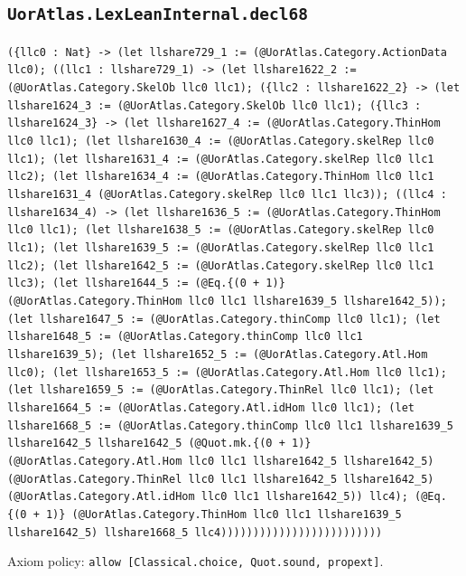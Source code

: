 \documentclass[11pt]{article}
\begin{document}
\subsection*{\texttt{UorAtlas.LexLeanInternal.decl68}}
\noindent\texttt{(\{llc0 : Nat\} -> (let llshare729\_1 := (@UorAtlas.Category.ActionData llc0); ((llc1 : llshare729\_1) -> (let llshare1622\_2 := (@UorAtlas.Category.SkelOb llc0 llc1); (\{llc2 : llshare1622\_2\} -> (let llshare1624\_3 := (@UorAtlas.Category.SkelOb llc0 llc1); (\{llc3 : llshare1624\_3\} -> (let llshare1627\_4 := (@UorAtlas.Category.ThinHom llc0 llc1); (let llshare1630\_4 := (@UorAtlas.Category.skelRep llc0 llc1); (let llshare1631\_4 := (@UorAtlas.Category.skelRep llc0 llc1 llc2); (let llshare1634\_4 := (@UorAtlas.Category.ThinHom llc0 llc1 llshare1631\_4 (@UorAtlas.Category.skelRep llc0 llc1 llc3)); ((llc4 : llshare1634\_4) -> (let llshare1636\_5 := (@UorAtlas.Category.ThinHom llc0 llc1); (let llshare1638\_5 := (@UorAtlas.Category.skelRep llc0 llc1); (let llshare1639\_5 := (@UorAtlas.Category.skelRep llc0 llc1 llc2); (let llshare1642\_5 := (@UorAtlas.Category.skelRep llc0 llc1 llc3); (let llshare1644\_5 := (@Eq.\{(0 + 1)\} (@UorAtlas.Category.ThinHom llc0 llc1 llshare1639\_5 llshare1642\_5)); (let llshare1647\_5 := (@UorAtlas.Category.thinComp llc0 llc1); (let llshare1648\_5 := (@UorAtlas.Category.thinComp llc0 llc1 llshare1639\_5); (let llshare1652\_5 := (@UorAtlas.Category.Atl.Hom llc0); (let llshare1653\_5 := (@UorAtlas.Category.Atl.Hom llc0 llc1); (let llshare1659\_5 := (@UorAtlas.Category.ThinRel llc0 llc1); (let llshare1664\_5 := (@UorAtlas.Category.Atl.idHom llc0 llc1); (let llshare1668\_5 := (@UorAtlas.Category.thinComp llc0 llc1 llshare1639\_5 llshare1642\_5 llshare1642\_5 (@Quot.mk.\{(0 + 1)\} (@UorAtlas.Category.Atl.Hom llc0 llc1 llshare1642\_5 llshare1642\_5) (@UorAtlas.Category.ThinRel llc0 llc1 llshare1642\_5 llshare1642\_5) (@UorAtlas.Category.Atl.idHom llc0 llc1 llshare1642\_5)) llc4); (@Eq.\{(0 + 1)\} (@UorAtlas.Category.ThinHom llc0 llc1 llshare1639\_5 llshare1642\_5) llshare1668\_5 llc4)))))))))))))))))))))))))}\par
\noindent Axiom policy: \texttt{allow [Classical.choice, Quot.sound, propext]}.\par
\end{document}
